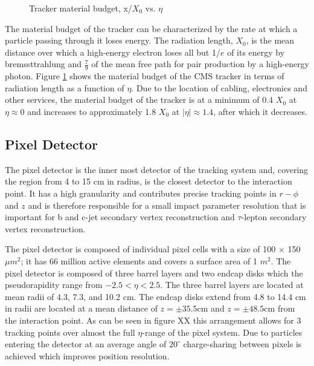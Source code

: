 \begin{figure}[hb]
\begin{subfigure}{.5\textwidth}
    \end{subfigure}	
  	\caption[Tracker Material Budget]
   	{Tracker material budget, x/$X_{0}$ vs. $\eta$}
	\label{fig:trackerMaterial}
\end{figure}

The material budget of the tracker can be characterized by the rate at which a particle
passing through it loses energy. The radiation length, $X_{0}$, is the 
mean distance over which a high-energy electron loses all but 1/$e$ 
of its energy by bremssttrahlung %
and $\frac{7}{9}$ of the mean free path for pair production by 
a high-energy photon. Figure \ref{fig:trackerMaterial}
shows the material budget of the CMS tracker in terms of radiation length as a function of $\eta$. 
Due to the location of cabling, electronics and other services, the material budget of the 
tracker is at a minimum of 0.4 $X_{0}$ at $\eta \approx 0$ and increases to approximately 1.8 $X_{0}$
at $|\eta| \approx 1.4$, after which it decreases. 

\subsection{Pixel Detector}%
The pixel detector is the inner most detector of the tracking system and,
covering the region from 4 to 15 cm in radius, is the closest detector to 
the interaction point. It has a high granularity and contributes precise 
tracking points in $r-\phi$ and $z$ and is therefore responsible for a small impact 
parameter resolution that is important for b and c-jet secondary
vertex reconstruction and $\tau$-lepton secondary vertex reconstruction.

The pixel detector is composed of individual pixel cells with a size of 
100 $\times$ 150 $\mu m^{2}$; it has 66 million active elements and covers
a surface area of 1 $m^{2}$. The pixel detector is composed of three barrel 
layers and two endcap disks which the pseudorapidity range from $-2.5<\eta<2.5$.
The three barrel layers are located at mean radii of 4.3, 7.3, and 10.2 cm. 
The endcap disks extend from 4.8 to 14.4 cm in radii are located at a mean distance
of $z=\pm35.5$cm and $z=\pm48.5$cm from the interaction point. 
As can be seen in figure XX this arrangement allows for 3 tracking points over %
almost the full $\eta$-range of the pixel system. Due to 
particles entering the detector at an average angle of $20^{\circ}$ 
charge-sharing between pixels is achieved which improves position resolution.

